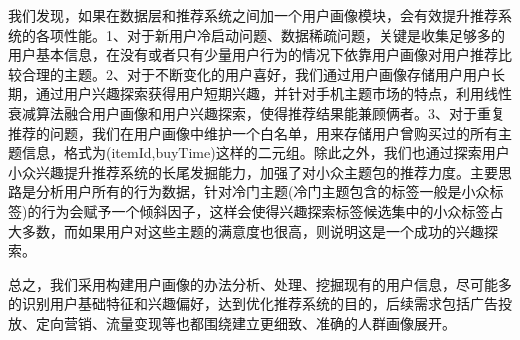 	我们发现，如果在数据层和推荐系统之间加一个用户画像模块，会有效提升推荐系统的各项性能。1、对于新用户冷启动问题、数据稀疏问题，关键是收集足够多的用户基本信息，在没有或者只有少量用户行为的情况下依靠用户画像对用户推荐比较合理的主题。2、对于不断变化的用户喜好，我们通过用户画像存储用户用户长期，通过用户兴趣探索获得用户短期兴趣，并针对手机主题市场的特点，利用线性衰减算法融合用户画像和用户兴趣探索，使得推荐结果能兼顾俩者。3、对于重复推荐的问题，我们在用户画像中维护一个白名单，用来存储用户曾购买过的所有主题信息，格式为(itemId,buyTime)这样的二元组。除此之外，我们也通过探索用户小众兴趣提升推荐系统的长尾发掘能力，加强了对小众主题包的推荐力度。主要思路是分析用户所有的行为数据，针对冷门主题(冷门主题包含的标签一般是小众标签)的行为会赋予一个倾斜因子，这样会使得兴趣探索标签候选集中的小众标签占大多数，而如果用户对这些主题的满意度也很高，则说明这是一个成功的兴趣探索。

	总之，我们采用构建用户画像的办法分析、处理、挖掘现有的用户信息，尽可能多的识别用户基础特征和兴趣偏好，达到优化推荐系统的目的，后续需求包括广告投放、定向营销、流量变现等也都围绕建立更细致、准确的人群画像展开。
